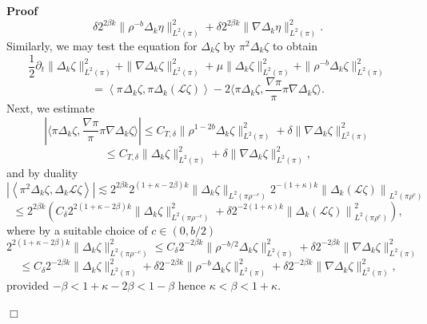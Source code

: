 \documentclass[a4paper,11pt]{article}
\newenvironment{proof}{\noindent\textbf{Proof\ }}{\hspace*{\fill}$\Box$\medskip}
\numberwithin{equation}{section}
\newcommand{\LL}{\mathscr{L}}
\newcommand{\8}{\infty}
\begin{document}
\begin{proof}
\[     \delta 2^{2 \beta k} \| \rho^{- b} \Delta_k \eta \|^2_{L^2 (\pi)} +
     \delta 2^{2 \beta k} \| \nabla \Delta_k \eta \|_{L^2 (\pi)}^2 . \]
  Similarly, we may test the equation for $\Delta_k \zeta$ by $\pi^2 \Delta_k
  \zeta$ to obtain
  \begin{equation}
    \frac{1}{2} \partial_t \| \Delta_k \zeta \|_{L^2 (\pi)}^2 + \| \nabla
    \Delta_k \zeta \|_{L^2 (\pi)}^2 + \mu \| \Delta_k \zeta \|_{L^2 (\pi)}^2 +
    \| \rho^{- b} \Delta_k \zeta \|_{L^2 (\pi)}^2 \label{eq:zeta}
  \end{equation}
  \[ = \left\langle \pi^{} \Delta_k \zeta, \pi \Delta_k \left( \LL \zeta
     \right) \right\rangle - 2 \langle \pi \Delta_k \zeta, \frac{\nabla
     \pi}{\pi} \pi \nabla \Delta_k \zeta \rangle . \]
  Next, we estimate
  \[ | \langle \pi \Delta_k \zeta, \frac{\nabla \pi}{\pi} \pi \nabla \Delta_k
     \zeta \rangle | \leqslant C_{T, \delta} \| \rho^{1 - 2 b} \Delta_k \zeta
     \|_{L^2 (\pi)}^2 + \delta \| \nabla \Delta_k \zeta \|_{L^2 (\pi)}^2 \]
  \[ \leqslant C_{T, \delta} \| \Delta_k \zeta \|_{L^2 (\pi)}^2 + \delta \|
    \nabla \Delta_k \zeta \|_{L^2 (\pi)}^2, \]
  and by duality
  \[ \left| \left\langle \pi^2 \Delta_k \zeta, \Delta_k \LL \zeta
     \right\rangle \right| \lesssim 2^{2 \beta k} 2^{(1 + \kappa - 2 \beta) k}
     \| \Delta_k \zeta \|_{L^2 (\pi \rho^{- c})} 2^{- (1 + \kappa) k} \left\|
     \Delta_k \left( \LL \zeta \right) \right\|_{L^2 (\pi \rho^c)} \]
  \[ \leqslant 2^{2 \beta k} \left( C_{\delta} 2^{2 (1 + \kappa - 2 \beta) k}
     \| \Delta_k \zeta \|^2_{L^2 (\pi \rho^{- c})} + \delta 2^{- 2 (1 +
     \kappa) k} \left\| \Delta_k \left( \LL \zeta \right) \right\|^2_{L^2 (\pi
     \rho^c)} \right), \]
  where by a suitable choice of $c \in (0, b / 2)$
  \[ 2^{2 (1 + \kappa - 2 \beta) k} \| \Delta_k \zeta \|^2_{L^2 (\pi \rho^{-
     c})} \leqslant C_{\delta} 2^{- 2 \beta k} \| \rho^{- b / 2} \Delta_k
     \zeta \|^2_{L^2 (\pi)} + \delta 2^{- 2 \beta k} \| \nabla \Delta_k \zeta
     \|^2_{L^2 (\pi)} \]
  \[ \leqslant C_{\delta} 2^{- 2 \beta k} \| \Delta_k \zeta \|^2_{L^2
     (\pi)} + \delta 2^{- 2 \beta k} \| \rho^{- b} \Delta_k \zeta \|^2_{L^2
     (\pi)} + \delta 2^{- 2 \beta k} \| \nabla \Delta_k \zeta \|_{L^2
     (\pi)}^2, \]
  provided $- \beta < 1 + \kappa - 2 \beta < 1 - \beta$ hence $\kappa < \beta
  < 1 + \kappa$.
  

\end{proof}
\end{document}
